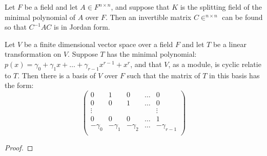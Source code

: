 \begin{theorem}\label{3.4.21}
    Let $F$ be a field and let  $A \in F^{n \times n}$, and suppose that $K$ is
    the splitting field of the minimal polynomial of  $A$ over  $F$. Then an
    invertible matrix  $C \in ^{n \times n}$ can be found so that $C^{-1}AC$ is
    in Jordan form.
\end{theorem}

\begin{lemma}\label{3.4.22}
    Let $V$ be a finite dimensional vector space over a field  $F$ and let  $T$
    be a linear transformation on  $V$. Suppose $T$ has the minimal polynomial:
    $p(x)=\gamma_0+\gamma_1x+\dots+\gamma_{r-1}x^{r-1}+x^r$, and that $V$, as a
    module, is cyclic relatie to $T$. Then there is a basis of $V$ over  $F$
    such that the matrix of  $T$ in this basis has the form:
        \begin{equation}
            \begin{pmatrix}
                0   &   1   &   0   &   \dots   &   0   \\
                0   &   0   &   1   &   \dots   &   0   \\
                \vdots  &   &   &   &   \vdots  \\
                0   &   0   &   0   &   \dots   &   1   \\
                -\gamma_0   & -\gamma_1 &   -\gamma_2   &   \dots   & -\gamma_{r-1}   \\
            \end{pmatrix}
        \end{equation}
\end{lemma}
\begin{proof}
\end{proof}

